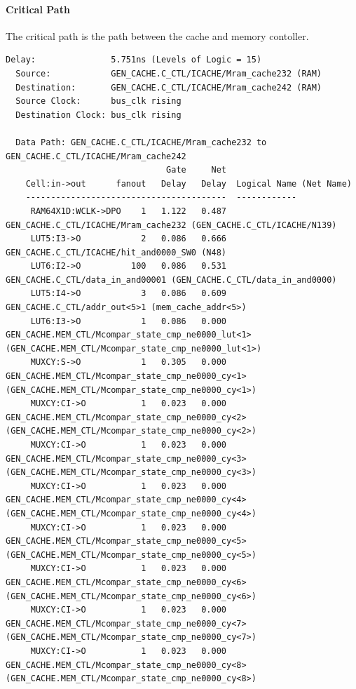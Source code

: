 \documentclass[11pt,letterpaper,]{article}
\begin{document}
\paragraph{ Critical Path }
The critical path is the path between the cache and memory contoller.

\begin{tiny}
\begin{verbatim}
Delay:               5.751ns (Levels of Logic = 15)
  Source:            GEN_CACHE.C_CTL/ICACHE/Mram_cache232 (RAM)
  Destination:       GEN_CACHE.C_CTL/ICACHE/Mram_cache242 (RAM)
  Source Clock:      bus_clk rising
  Destination Clock: bus_clk rising

  Data Path: GEN_CACHE.C_CTL/ICACHE/Mram_cache232 to GEN_CACHE.C_CTL/ICACHE/Mram_cache242
                                Gate     Net
    Cell:in->out      fanout   Delay   Delay  Logical Name (Net Name)
    ----------------------------------------  ------------
     RAM64X1D:WCLK->DPO    1   1.122   0.487  GEN_CACHE.C_CTL/ICACHE/Mram_cache232 (GEN_CACHE.C_CTL/ICACHE/N139)
     LUT5:I3->O            2   0.086   0.666  GEN_CACHE.C_CTL/ICACHE/hit_and0000_SW0 (N48)
     LUT6:I2->O          100   0.086   0.531  GEN_CACHE.C_CTL/data_in_and00001 (GEN_CACHE.C_CTL/data_in_and0000)
     LUT5:I4->O            3   0.086   0.609  GEN_CACHE.C_CTL/addr_out<5>1 (mem_cache_addr<5>)
     LUT6:I3->O            1   0.086   0.000  GEN_CACHE.MEM_CTL/Mcompar_state_cmp_ne0000_lut<1> (GEN_CACHE.MEM_CTL/Mcompar_state_cmp_ne0000_lut<1>)
     MUXCY:S->O            1   0.305   0.000  GEN_CACHE.MEM_CTL/Mcompar_state_cmp_ne0000_cy<1> (GEN_CACHE.MEM_CTL/Mcompar_state_cmp_ne0000_cy<1>)
     MUXCY:CI->O           1   0.023   0.000  GEN_CACHE.MEM_CTL/Mcompar_state_cmp_ne0000_cy<2> (GEN_CACHE.MEM_CTL/Mcompar_state_cmp_ne0000_cy<2>)
     MUXCY:CI->O           1   0.023   0.000  GEN_CACHE.MEM_CTL/Mcompar_state_cmp_ne0000_cy<3> (GEN_CACHE.MEM_CTL/Mcompar_state_cmp_ne0000_cy<3>)
     MUXCY:CI->O           1   0.023   0.000  GEN_CACHE.MEM_CTL/Mcompar_state_cmp_ne0000_cy<4> (GEN_CACHE.MEM_CTL/Mcompar_state_cmp_ne0000_cy<4>)
     MUXCY:CI->O           1   0.023   0.000  GEN_CACHE.MEM_CTL/Mcompar_state_cmp_ne0000_cy<5> (GEN_CACHE.MEM_CTL/Mcompar_state_cmp_ne0000_cy<5>)
     MUXCY:CI->O           1   0.023   0.000  GEN_CACHE.MEM_CTL/Mcompar_state_cmp_ne0000_cy<6> (GEN_CACHE.MEM_CTL/Mcompar_state_cmp_ne0000_cy<6>)
     MUXCY:CI->O           1   0.023   0.000  GEN_CACHE.MEM_CTL/Mcompar_state_cmp_ne0000_cy<7> (GEN_CACHE.MEM_CTL/Mcompar_state_cmp_ne0000_cy<7>)
     MUXCY:CI->O           1   0.023   0.000  GEN_CACHE.MEM_CTL/Mcompar_state_cmp_ne0000_cy<8> (GEN_CACHE.MEM_CTL/Mcompar_state_cmp_ne0000_cy<8>)

\end{verbatim}
\end{tiny}
\end{document}
